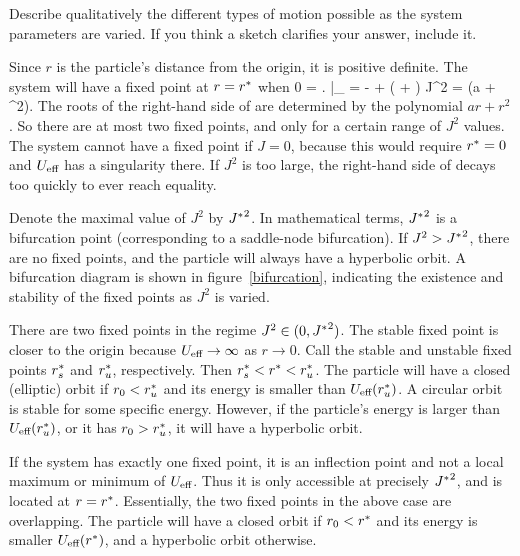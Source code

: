 \begin{problem}
	Describe qualitatively the different types of motion possible as the system parameters are varied.  If you think a sketch clarifies your answer, include it.
\end{problem}

\begin{solution}
	Since $r$ is the particle's distance from the origin, it is positive definite.  The system will have a fixed point at $r = r^*$ when
	\beqn \label{fp}
		0 = \left.  \right|_{\rs}
		= - +  \left(  +  \right)
		\implies
		J^2 =  (a \rs + {\rs}^2).
	\eeqn
	The roots of the right-hand side of  are determined by the polynomial $a r + r^2$.  So there are at most two fixed points, and only for a certain range of $J^2$ values.  The system cannot have a fixed point if $J = 0$, because this would require $r^* = 0$ and $U_\text{eff}$ has a singularity there.  If $J^2$ is too large, the right-hand side of  decays too quickly to ever reach equality.
	
	Denote the maximal value of $J^2$ by ${J^*}^2$.  In mathematical terms, ${J^*}^2$ is a bifurcation point (corresponding to a saddle-node bifurcation).  If $J^2 > {J^*}^2$, there are no fixed points, and the particle will always have a hyperbolic orbit. A bifurcation diagram is shown in figure~\ref{bifurcation}, indicating the existence and stability of the fixed points as $J^2$ is varied.
	
	There are two fixed points in the regime $J^2 \in (0, {J^*}^2)$.  The stable fixed point is closer to the origin because $U_\text{eff} \to \infty$ as $r \to 0$.  Call the stable and unstable fixed points $r^*_s$ and $r^*_u$, respectively.  Then $r^*_s < r^* < r^*_u$.  The particle will have a closed (elliptic) orbit if $r_0 < r^*_u$ and its energy is smaller than $U_\text{eff}(r^*_u)$.  A circular orbit is stable for some specific energy.  However, if the particle's energy is larger than $U_\text{eff}(r^*_u)$, or it has $r_0 > r^*_u$, it will have a hyperbolic orbit.

	If the system has exactly one fixed point, it is an inflection point and not a local maximum or minimum of $U_\text{eff}$.  Thus it is only accessible at precisely ${J^*}^2$, and is located at $r = r^*$.  Essentially, the two fixed points in the above case are overlapping.  The particle will have a closed orbit if $r_0 < r^*$ and its energy is smaller $U_\text{eff}(r^*)$, and a hyperbolic orbit otherwise.
\end{solution}